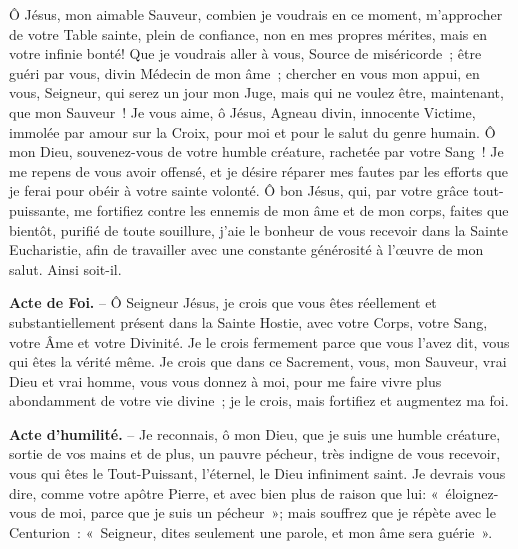 \newpage
\fontsize{11.5}{13}\selectfont
\begin{center}\end{center}

Ô Jésus, mon aimable Sauveur, combien je voudrais en ce moment, m’approcher de votre Table sainte, plein de confiance, non en mes propres mérites, mais en votre infinie bonté! Que je voudrais aller à vous, Source de miséricorde~; être guéri par vous, divin Médecin de mon âme~; chercher en vous mon appui, en vous, Seigneur, qui serez un jour mon Juge, mais qui ne voulez être, maintenant, que mon Sauveur~! Je vous aime, ô Jésus, Agneau divin, innocente Victime, immolée par amour sur la Croix, pour moi et pour le salut du genre humain. Ô mon Dieu, souvenez-vous de votre humble créature, rachetée par votre Sang~! Je me repens de vous avoir offensé, et je désire réparer mes fautes par les efforts que je ferai pour obéir à votre sainte volonté. Ô bon Jésus, qui, par votre grâce tout-puissante, me fortifiez contre les ennemis de mon âme et de mon corps, faites que bientôt, purifié de toute souillure, j’aie le bonheur de vous recevoir dans la Sainte Eucharistie, afin de travailler avec une constante générosité à l’œuvre de mon salut. Ainsi soit-il.\par\vspace{0.2cm}
\begin{center}\end{center}

\textbf{Acte de Foi.} – Ô Seigneur Jésus, je crois que vous êtes réellement et substantiellement présent dans la Sainte Hostie, avec votre Corps, votre Sang, votre Âme et votre Divinité. Je le crois fermement parce que vous l’avez dit, vous qui êtes la vérité même. Je crois que dans ce Sacrement, vous, mon Sauveur, vrai Dieu et vrai homme, vous vous donnez à moi, pour me faire vivre plus abondamment de votre vie divine~; je le crois, mais fortifiez et augmentez ma foi.

\textbf{Acte d’humilité.} – Je reconnais, ô mon Dieu, que je suis une humble créature, sortie de vos mains et de plus, un pauvre pécheur, très indigne de vous recevoir, vous qui êtes le Tout-Puissant, l’éternel, le Dieu infiniment saint. Je devrais vous dire, comme votre apôtre Pierre, et avec bien plus de raison que lui: «~éloignez-vous de moi, parce que je suis un pécheur~»; mais souffrez que je répète avec le Centurion~: «~Seigneur, dites seulement une parole, et mon âme sera guérie~».

